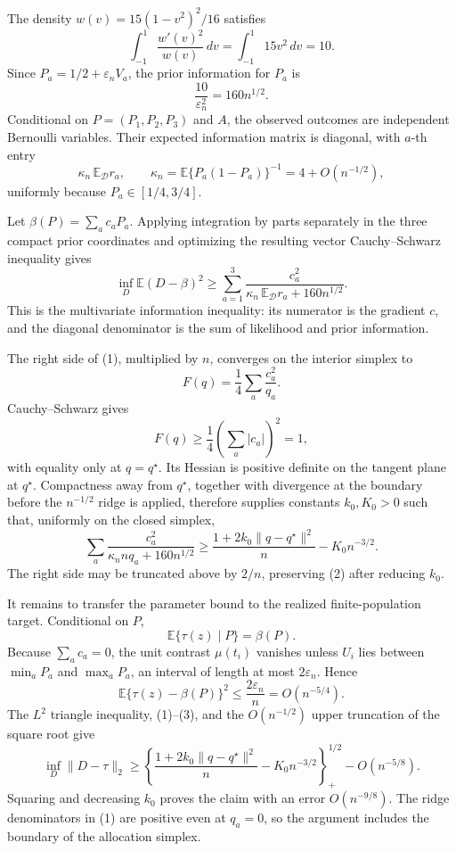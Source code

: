The density \(w(v)=15(1-v^2)^2/16\) satisfies
\[
\int_{-1}^1\frac{w'(v)^2}{w(v)}\,dv
=\int_{-1}^1 15v^2\,dv=10.
\]
Since \(P_a=1/2+\varepsilon_nV_a\), the prior information for \(P_a\) is
\[
\frac{10}{\varepsilon_n^2}=160n^{1/2}.
\]
Conditional on \(P=(P_1,P_2,P_3)\) and \(A\), the observed outcomes are independent Bernoulli variables.  Their expected information matrix is diagonal, with \(a\)-th entry
\[
\kappa_n\,\mathbb E_{\mathcal D}r_a,\qquad
\kappa_n=\mathbb E\{P_a(1-P_a)\}^{-1}=4+O(n^{-1/2}),
\]
uniformly because \(P_a\in[1/4,3/4]\).

Let \(\beta(P)=\sum_ac_aP_a\).  Applying integration by parts separately in the three compact prior coordinates and optimizing the resulting vector Cauchy--Schwarz inequality gives
\[
\inf_D\mathbb E(D-\beta)^2
\geq
\sum_{a=1}^3
\frac{c_a^2}{\kappa_n\,\mathbb E_{\mathcal D}r_a+160n^{1/2}}.
\tag{1}
\]
This is the multivariate information inequality: its numerator is the gradient \(c\), and the diagonal denominator is the sum of likelihood and prior information.

The right side of (1), multiplied by \(n\), converges on the interior simplex to
\[
F(q)=\frac14\sum_a\frac{c_a^2}{q_a}.
\]
Cauchy--Schwarz gives
\[
F(q)\geq\frac14\left(\sum_a|c_a|\right)^2=1,
\]
with equality only at \(q=q^\star\).  Its Hessian is positive definite on the tangent plane at \(q^\star\).  Compactness away from \(q^\star\), together with divergence at the boundary before the \(n^{-1/2}\) ridge is applied, therefore supplies constants \(k_0,K_0>0\) such that, uniformly on the closed simplex,
\[
\sum_a
\frac{c_a^2}{\kappa_n n q_a+160n^{1/2}}
\geq \frac{1+2k_0\|q-q^\star\|^2}{n}-K_0n^{-3/2}.
\tag{2}
\]
The right side may be truncated above by \(2/n\), preserving (2) after reducing \(k_0\).

It remains to transfer the parameter bound to the realized finite-population target.  Conditional on \(P\),
\[
\mathbb E\{\tau(z)\mid P\}=\beta(P).
\]
Because \(\sum_ac_a=0\), the unit contrast \(\mu(t_i)\) vanishes unless \(U_i\) lies between \(\min_aP_a\) and \(\max_aP_a\), an interval of length at most \(2\varepsilon_n\).  Hence
\[
\mathbb E\{\tau(z)-\beta(P)\}^2
\leq\frac{2\varepsilon_n}{n}=O(n^{-5/4}).
\tag{3}
\]
The \(L^2\) triangle inequality, (1)--(3), and the \(O(n^{-1/2})\) upper truncation of the square root give
\[
\inf_D\|D-\tau\|_2
\geq
\left\{\frac{1+2k_0\|q-q^\star\|^2}{n}
-K_0n^{-3/2}\right\}_+^{1/2}
-O(n^{-5/8}).
\]
Squaring and decreasing \(k_0\) proves the claim with an error \(O(n^{-9/8})\).  The ridge denominators in (1) are positive even at \(q_a=0\), so the argument includes the boundary of the allocation simplex.

